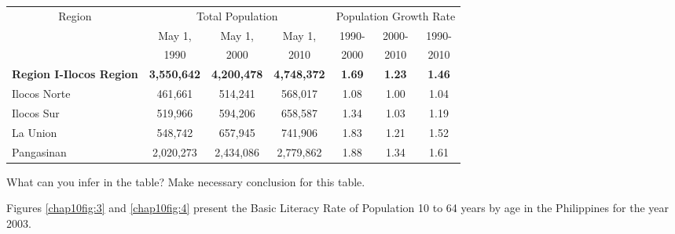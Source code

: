 \begin{myenumerate}
\begin{center}
\begin{tabular}{lcccccc}
\hline \hline 
\multicolumn{1}{c}{Region} & \multicolumn{3}{c}{Total Population} & \multicolumn{3}{c}{Population Growth Rate}\\
 & May 1, & May 1, & May 1, & 1990- & 2000- & 1990-\\
 & 1990 & 2000 & 2010 & 2000 & 2010 & 2010 \\
\hline
\textbf{Region I-Ilocos Region} & \textbf{3,550,642} & \textbf{4,200,478} & \textbf{4,748,372} & \textbf{1.69} & \textbf{1.23} & \textbf{1.46}\\
Ilocos Norte & 461,661 & 514,241 & 568,017 & 1.08 & 1.00 & 1.04\\
Ilocos Sur & 519,966 & 594,206 & 658,587 & 1.34 & 1.03 & 1.19\\
La Union & 548,742 & 657,945 & 741,906 & 1.83 & 1.21 & 1.52\\
Pangasinan & 2,020,273 & 2,434,086 & 2,779,862 & 1.88 & 1.34 & 1.61\\
\hline 
\end{tabular}
\end{center}

What can you infer in the table? Make necessary conclusion for this table.

\item Figures \eqref{chap10fig:3} and \eqref{chap10fig:4} present the Basic Literacy Rate of Population 10 to 64 years by age
in the Philippines for the year 2003.


\end{myenumerate}
